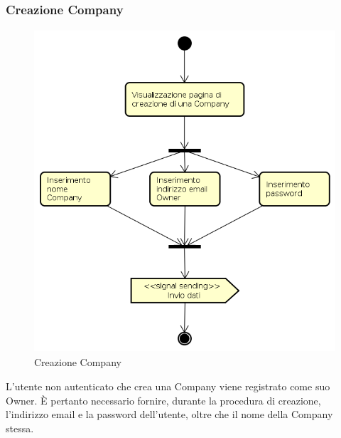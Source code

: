 \subsubsection{Creazione Company}
\begin{figure}[H]
\begin{center}
\includegraphics[height=12cm]{res/sections/backend/activities/creazioneCompany.png}
\caption{Creazione Company}
\end{center}
\end{figure}
L'utente non autenticato che crea una Company viene registrato come suo Owner. È pertanto necessario fornire, durante la procedura di creazione, l'indirizzo email e la password dell'utente, oltre che il nome della Company stessa.
\newpage
